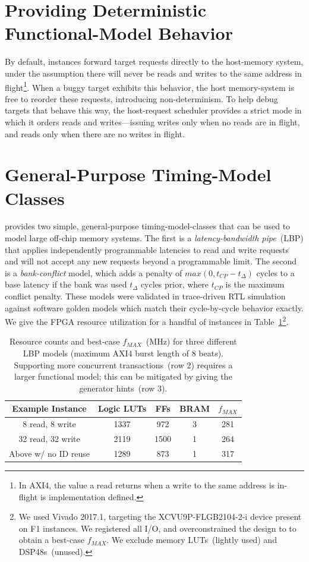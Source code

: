 \section{Providing Deterministic Functional-Model Behavior}
By default, instances forward target requests directly to the host-memory
system, under the assumption there will never be reads and writes to the same
address in flight\footnote{In AXI4, the value a read returns when a write to
the same address is in-flight is implementation defined.}. When a buggy target
exhibits this behavior, the host memory-system is free to reorder these
requests, introducing non-determinism. To help debug targets that behave this
way, the host-request scheduler provides a strict mode in which it orders reads
and writes---issuing writes only when no reads are in flight, and reads only
when there are no writes in flight.

\section{General-Purpose Timing-Model Classes}\label{sec:timing_model}

\PNAME provides two simple, general-purpose timing-model-classes that can be used to
model large off-chip memory systems. The first is a \emph{latency-bandwidth
pipe}~(LBP) that applies independently programmable latencies to read and write
requests and will not accept any new requests beyond a programmable limit. The
second is a \emph{bank-conflict} model, which adds a penalty of $max(0, t_{CP} -
t_{\Delta})$ cycles to a base latency if the bank was used
$t_{\Delta}$ cycles prior, where $t_{CP}$ is the maximum conflict penalty.
These models were validated in trace-driven RTL simulation against
software golden models which match their cycle-by-cycle behavior exactly.  We
give the FPGA resource utilization for a handful of
instances in Table~\ref{tbl:lbp-model-resources}\footnote{We
used Vivado 2017.1, targeting the XCVU9P-FLGB2104-2-i device present on F1
instances. We registered all I/O, and overconstrained the design
to  to obtain a best-case $f_{MAX}$. We exclude memory
LUTs~(lightly used) and DSP48s~(unused).}.

\begin{table}[htb]
\centering
    \begin{tabular}{c c c c c }
	\hline
        \textbf{Example Instance} & Logic LUTs & FFs & BRAM & $f_{MAX}$ \\
	\hline
        8 read, 8 write & 1337 & 972 & 3 &  281 \\
        32 read, 32 write & 2119 & 1500 & 1 & 264 \\
        Above w/ no ID reuse & 1289 & 873 & 1 & 317 \\
	\hline
	\end{tabular}
    \caption{Resource counts and best-case $f_{MAX}$~(MHz) for three different
    LBP models (maximum AXI4 burst length of 8 beats). Supporting more concurrent transactions~(row 2) requires a larger
    functional model; this can be mitigated by giving the generator hints~(row 3).}
\label{tbl:lbp-model-resources}
\end{table}

